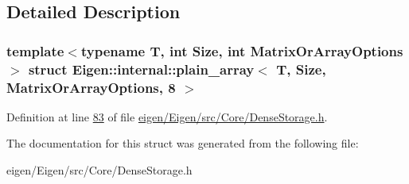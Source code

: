 \subsection{Detailed Description}
\subsubsection*{template$<$typename T, int Size, int Matrix\+Or\+Array\+Options$>$\newline
struct Eigen\+::internal\+::plain\+\_\+array$<$ T, Size, Matrix\+Or\+Array\+Options, 8 $>$}



Definition at line \hyperlink{eigen_2_eigen_2src_2_core_2_dense_storage_8h_source_l00083}{83} of file \hyperlink{eigen_2_eigen_2src_2_core_2_dense_storage_8h_source}{eigen/\+Eigen/src/\+Core/\+Dense\+Storage.\+h}.



The documentation for this struct was generated from the following file\+:\begin{DoxyCompactItemize}
\item 
eigen/\+Eigen/src/\+Core/\+Dense\+Storage.\+h\end{DoxyCompactItemize}
